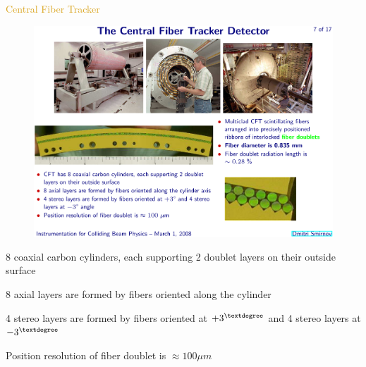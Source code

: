 \begin{frame}{\textcolor{Goldenrod}{Central Fiber Tracker}}
  \begin{overlayarea}{\textwidth}{\textheight}
    \begin{figure}[h]\centering
      \includegraphics[height=0.3\textheight]{./Images/13_CFT}
    \end{figure}
    \itt[<+->]  

      
    
    \item 8 coaxial carbon cylinders, each supporting 2 doublet layers
      on their outside surface
    \item 8 axial layers are formed by fibers oriented along the
      cylinder
    \item 4 stereo layers are formed by fibers oriented at $+3^{\textdegree}$ and 4 stereo
      layers at $-3^{\textdegree}$
    \item Position resolution of fiber doublet is $\approx 100 \mu m$
      \tti
\end{overlayarea}
\end{frame}


